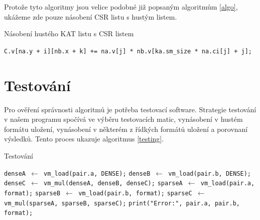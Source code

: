 Protože tyto algoritmy jsou velice podobné již popsaným algoritmům \ref{algo}, ukážeme zde pouze násobení CSR listu s hustým listem.

\begin{algorithm}[htb]
	\caption{Násobení hustého KAT listu s CSR listem}\label{kat-mmm-den-csr}
	\begin{algorithmic}[1]
					\State \texttt{C.v[na.y + i][nb.x + k] += na.v[j] * nb.v[ka.sm\_size * na.ci[j] + j];}
				\EndFor
			\EndFor
		\EndFor
		\EndProcedure
	\end{algorithmic}
\end{algorithm}



\section{Testování}

Pro ověření správnosti algoritmů je potřeba testovací software. Strategie testování v našem programu spočívá ve výběru testovacích matic, vynásobení v hustém formátu uložení, vynásobení v některém z řídkých formátů uložení a porovnaní výsledků. Tento proces ukazuje algoritmus \ref{testing}.

\begin{algorithm}[htb]
	\caption{Testování}\label{testing}
	\begin{algorithmic}[1]
				\State \texttt{denseA $\gets$ vm\_load(pair.a, DENSE);}
				\State \texttt{denseB $\gets$ vm\_load(pair.b, DENSE);}
				\State \texttt{denseC $\gets$ vm\_mul(denseA, denseB, denseC);}
				\State \texttt{sparseA $\gets$ vm\_load(pair.a, format);}
				\State \texttt{sparseB $\gets$ vm\_load(pair.b, format);}
				\State \texttt{sparseC $\gets$ vm\_mul(sparseA, sparseB, sparseC);}
					\State \texttt{print("Error:", pair.a, pair.b, format);}
				\EndIf
			\EndFor
		\EndFor
		\EndProcedure
	\end{algorithmic}
\end{algorithm}

